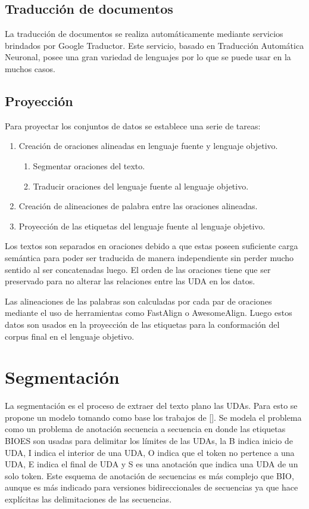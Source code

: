 \subsection{Traducción de documentos}

La traducción de documentos se realiza automáticamente mediante servicios brindados por Google Traductor.
Este servicio, basado en Traducción Automática Neuronal, posee una gran variedad de lenguajes por lo que
se puede usar en la muchos casos.

\subsection{Proyección}

Para proyectar los conjuntos de datos se establece una serie de tareas:

\begin{enumerate}
    \item Creación de oraciones alineadas en lenguaje fuente y lenguaje objetivo.
    \begin{enumerate}
        \item Segmentar oraciones del texto.
        \item Traducir oraciones del lenguaje fuente al lenguaje objetivo.
    \end{enumerate}
    \item Creación de alineaciones de palabra entre las oraciones alineadas.
    \item Proyección de las etiquetas del lenguaje fuente al lenguaje objetivo. 
\end{enumerate}

Los textos son separados en oraciones debido a que estas poseen suficiente carga semántica
para poder ser traducida de manera independiente sin perder mucho sentido al ser concatenadas
luego. El orden de las oraciones tiene que ser preservado para no alterar las relaciones entre 
las UDA en los datos. 

Las alineaciones de las palabras son calculadas por cada par de oraciones mediante el uso de 
herramientas como FastAlign o AwesomeAlign. Luego estos datos son usados en la proyección de 
las etiquetas para la conformación del corpus final en el lenguaje objetivo.

\section{Segmentación}

La segmentación es el proceso de extraer del texto plano las UDAs. Para esto se propone un modelo
tomando como base los trabajos de [\cite{ma2016end}]. Se modela el problema como un problema de anotación
secuencia a secuencia en donde las etiquetas BIOES son usadas para delimitar los límites de las 
UDAs, la B indica inicio de UDA, I indica el interior de una UDA, O indica que el token no pertence
a una UDA, E indica el final de UDA y S es una anotación que indica una UDA de un solo token. 
Este esquema de anotación de secuencias es más complejo que BIO, aunque es más indicado
para versiones bidireccionales de secuencias ya que hace explícitas las delimitaciones de las 
secuencias.

